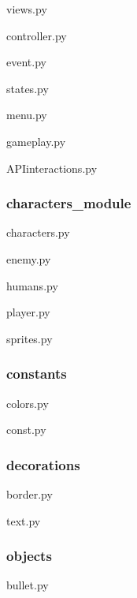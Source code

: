 views.py


controller.py


event.py


states.py


menu.py


gameplay.py


APIinteractions.py


\subsubsection{characters\_module}
characters.py

enemy.py


humans.py


player.py


sprites.py


\subsubsection{constants}

colors.py


const.py


\subsubsection{decorations}
border.py

text.py

\subsubsection{objects}
bullet.py



